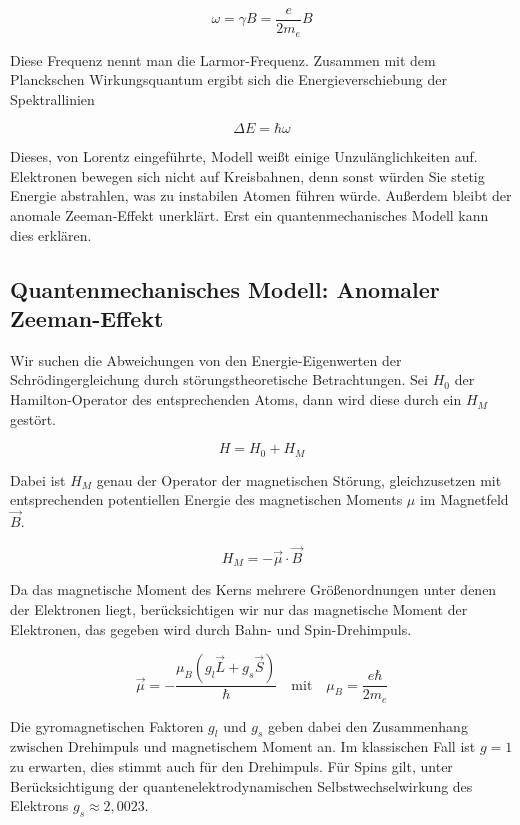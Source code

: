 \documentclass[a4paper,german,12pt,smallheadings]{scrartcl}
\begin{document}
\begin{equation}
  \omega = \gamma B = \frac{e}{2m_e} B
\end{equation}

Diese Frequenz nennt man die Larmor-Frequenz. Zusammen mit dem Planckschen
Wirkungsquantum ergibt sich die Energieverschiebung der Spektrallinien

\begin{equation}
  \Delta E = \hbar \omega
\end{equation}

Dieses, von Lorentz eingeführte, Modell weißt einige Unzulänglichkeiten auf.
Elektronen bewegen sich nicht auf Kreisbahnen, denn sonst würden Sie stetig
Energie abstrahlen, was zu instabilen Atomen führen würde. Außerdem bleibt der
anomale Zeeman-Effekt unerklärt. Erst ein quantenmechanisches Modell kann dies
erklären.

\subsection{Quantenmechanisches Modell: Anomaler Zeeman-Effekt}
Wir suchen die Abweichungen von den Energie-Eigenwerten der
Schrödingergleichung durch störungstheoretische Betrachtungen. Sei $H_0$ der
Hamilton-Operator des entsprechenden Atoms, dann wird diese durch ein $H_M$
gestört.

\begin{equation}
  H = H_0 + H_M
\end{equation}

Dabei ist $H_M$ genau der Operator der magnetischen Störung, gleichzusetzen mit
entsprechenden potentiellen Energie des magnetischen Moments $\mu$ im
Magnetfeld $\vec{B}$.

\begin{equation}
  H_M = - \vec{\mu} \cdot \vec{B}
\end{equation}

Da das magnetische Moment des Kerns mehrere Größenordnungen unter denen der
Elektronen liegt, berücksichtigen wir nur das magnetische Moment der
Elektronen, das gegeben wird durch Bahn- und Spin-Drehimpuls.

\begin{equation}
  \vec{\mu} = -\frac{\mu_B (g_l \vec{L} + g_s \vec{S})}{\hbar} \quad \text{mit} \quad \mu_B = \frac{e \hbar}{2 m_e}
\end{equation}

Die gyromagnetischen Faktoren $g_l$ und $g_s$ geben dabei den Zusammenhang
zwischen Drehimpuls und magnetischem Moment an. Im klassischen Fall ist $g = 1$
zu erwarten, dies stimmt auch für den Drehimpuls. Für Spins gilt, unter
Berücksichtigung der quantenelektrodynamischen Selbstwechselwirkung des
Elektrons $g_s \approx 2{,}0023$.
\end{document}
